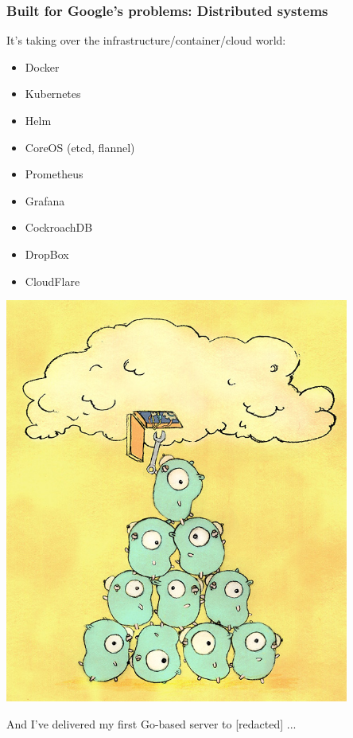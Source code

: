 \documentclass[handout,compress,t,11pt]{beamer}
\begin{document}
\begin{frame}
    \frametitle{Built for Google's problems: Distributed systems}
    It's taking over the infrastructure/container/cloud world: \par
    \vspace{0.4\baselineskip}
    \begin{minipage}[c]{0.55\textwidth}
    \begin{itemize}
        \item Docker 
        \item Kubernetes
        \item Helm
        \item CoreOS (etcd, flannel)
        \item Prometheus 
        \item Grafana
        \item CockroachDB
        \item DropBox
        \item CloudFlare
    \end{itemize}
    \end{minipage}%
    \begin{minipage}[c]{0.35\textwidth}
        \vspace{0.5\baselineskip}
        \hfill \includegraphics[width=0.85\textwidth,height=.5\textheight]{gophers10th.jpg}
        \vspace{-1.2\baselineskip}
        \begin{center}\hspace{0.94in}{\tiny\textcopyright Ren\'ee French} \end{center}
    \end{minipage} \par
    \vspace{1.5\baselineskip}
    And I've delivered my first Go-based server to [redacted] ...
\end{frame}
\end{document}
